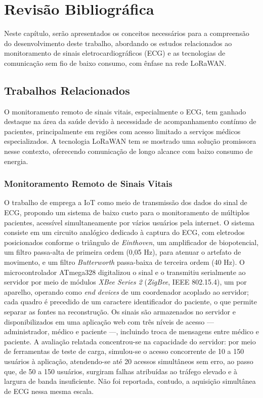 \chapter{Revisão Bibliográfica}
\label{chap:conceitos}

Neste capítulo, serão apresentados os conceitos necessários para a compreensão do desenvolvimento deste trabalho, abordando os estudos relacionados ao monitoramento de sinais eletrocardiográficos (ECG) e as tecnologias de comunicação sem fio de baixo consumo, com ênfase na rede LoRaWAN.

\section{Trabalhos Relacionados}
\label{sec:trabalhosRelacionados}

O monitoramento remoto de sinais vitais, especialmente o \acs{ECG}, tem ganhado destaque na área da saúde devido à necessidade de acompanhamento contínuo de pacientes, principalmente em regiões com acesso limitado a serviços médicos especializados. A tecnologia LoRaWAN tem se mostrado uma solução promissora nesse contexto, oferecendo comunicação de longo alcance com baixo consumo de energia.

\subsection{Monitoramento Remoto de Sinais Vitais}
O trabalho de \cite{7814958} emprega a \acs{IoT} como meio de transmissão dos dados do sinal de \acs{ECG}, propondo um sistema de baixo custo para o monitoramento de múltiplos pacientes, acessível simultaneamente por vários usuários pela internet. O sistema consiste em um circuito analógico dedicado à captura do \acs{ECG}, com eletrodos posicionados conforme o triângulo de \textit{Einthoven}, um amplificador de biopotencial, um filtro passa-alta de primeira ordem (0,05 Hz), para atenuar o artefato de movimento, e um filtro \textit{Butterworth} passa-baixa de terceira ordem (40 Hz). O microcontrolador ATmega328 digitalizou o sinal e o transmitiu serialmente ao servidor por meio de módulos \textit{XBee Series 2} (\textit{ZigBee}, IEEE 802.15.4), um por aparelho, operando como \textit{end devices} de um coordenador acoplado ao servidor; cada quadro é precedido de um caractere identificador do paciente, o que permite separar as fontes na reconstrução. Os sinais são armazenados no servidor e disponibilizados em uma aplicação web com três níveis de acesso --- administrador, médico e paciente ---, incluindo troca de mensagens entre médico e paciente. A avaliação relatada concentrou-se na capacidade do servidor: por meio de ferramentas de teste de carga, simulou-se o acesso concorrente de 10 a 150 usuários à aplicação, atendendo-se até 20 acessos simultâneos sem erro, ao passo que, de 50 a 150 usuários, surgiram falhas atribuídas ao tráfego elevado e à largura de banda insuficiente. Não foi reportada, contudo, a aquisição simultânea de \acs{ECG} nessa mesma escala.

